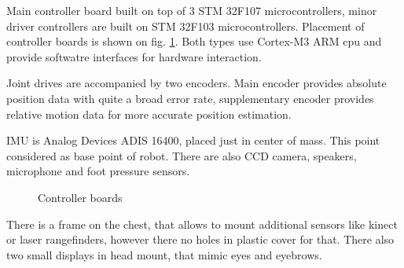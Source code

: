 \documentclass[letterpaper, 10 pt, conference]{ieeeconf}  %
\begin{document}
Main controller board built on top of 3 STM 32F107 microcontrollers, minor
driver controllers are built on STM 32F103 microcontrollers. Placement of
controller boards is shown on fig. \ref{img:electronics}.  Both types use
Cortex-M3 ARM cpu and provide softwatre interfaces for hardware interaction.

Joint drives are accompanied by two encoders. Main encoder provides absolute
position data with quite a broad error rate, supplementary encoder provides
relative motion data for more accurate position estimation.

IMU is Analog Devices ADIS 16400, placed just in center of mass. This point
considered as base point of robot. There are
also CCD camera, speakers, microphone and foot pressure sensors.

\begin{figure}[thpb]
\caption{Controller boards}
\label{img:electronics}
\end{figure}  

There is a frame on the chest, that allows to mount additional sensors like
kinect or laser rangefinders, however there no holes in plastic cover for that.
There also two small displays in head mount, that mimic eyes and eyebrows.
\end{document}
